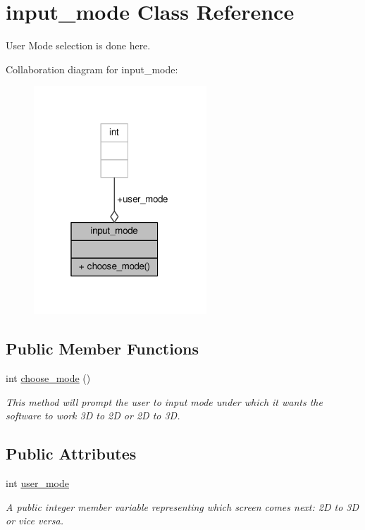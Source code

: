 \hypertarget{classinput__mode}{}\section{input\+\_\+mode Class Reference}
\label{classinput__mode}


User Mode selection is done here.  




Collaboration diagram for input\+\_\+mode\+:\nopagebreak
\begin{figure}[H]
\begin{center}
\leavevmode
\includegraphics[width=184pt]{classinput__mode__coll__graph}
\end{center}
\end{figure}
\subsection*{Public Member Functions}
\begin{DoxyCompactItemize}
\item 
int \hyperlink{classinput__mode_a48d0784654dc00fc029fc29fde788c65}{choose\+\_\+mode} ()
\begin{DoxyCompactList}\small\item\em This method will prompt the user to input mode under which it wants the software to work 3D to 2D or 2D to 3D. \end{DoxyCompactList}\end{DoxyCompactItemize}
\subsection*{Public Attributes}
\begin{DoxyCompactItemize}
\item 
int \hyperlink{classinput__mode_ae21dca33a5290ebe9d4e75d9378ef206}{user\+\_\+mode}
\begin{DoxyCompactList}\small\item\em A public integer member variable representing which screen comes next\+: 2D to 3D or vice versa. \end{DoxyCompactList}\end{DoxyCompactItemize}


